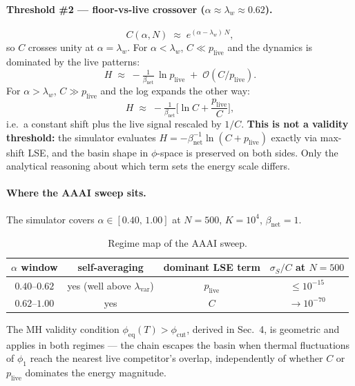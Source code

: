 \documentclass[11pt]{article}
\begin{document}
\paragraph{Threshold \#2 — floor-vs-live crossover ($\alpha \approx \lambda_w \approx 0.62$).}
\begin{equation}
C(\alpha, N) \;\approx\; e^{(\alpha - \lambda_w)\,N},
\end{equation}
so $C$ crosses unity at $\alpha = \lambda_w$. For $\alpha < \lambda_w$, $C\ll p_{\mathrm{live}}$ and the dynamics is dominated by the live patterns:
\begin{equation}
H \;\approx\; -\tfrac{1}{\beta_{\mathrm{net}}}\,\ln p_{\mathrm{live}} \;+\; \mathcal{O}(C/p_{\mathrm{live}}).
\end{equation}
For $\alpha > \lambda_w$, $C\gg p_{\mathrm{live}}$ and the log expands the other way:
\begin{equation}
H \;\approx\; -\tfrac{1}{\beta_{\mathrm{net}}}\!\Big[\ln C + \frac{p_{\mathrm{live}}}{C}\Big],
\end{equation}
i.e.\ a constant shift plus the live signal rescaled by $1/C$. \textbf{This is not a validity threshold:} the simulator evaluates $H = -\beta_{\mathrm{net}}^{-1}\ln(C+p_{\mathrm{live}})$ exactly via max-shift LSE, and the basin shape in $\phi$-space is preserved on both sides. Only the analytical reasoning about which term sets the energy scale differs.

\paragraph{Where the AAAI sweep sits.}
The simulator covers $\alpha \in [0.40,\,1.00]$ at $N=500$, $K=10^4$, $\beta_{\mathrm{net}}=1$.
\begin{table}[h]
\centering
\caption{Regime map of the AAAI sweep.}
\begin{tabular}{cccc}
\toprule
$\alpha$ window & self-averaging & dominant LSE term & $\sigma_S/C$ at $N=500$ \\
\midrule
$0.40$–$0.62$ & yes (well above $\lambda_{\mathrm{var}}$) & $p_{\mathrm{live}}$ & $\le 10^{-15}$ \\
$0.62$–$1.00$ & yes               & $C$                  & $\to 10^{-70}$ \\
\bottomrule
\end{tabular}
\end{table}

The MH validity condition $\phi_{\mathrm{eq}}(T) > \phi_{\mathrm{cut}}$, derived in Sec.~4, is geometric and applies in both regimes — the chain escapes the basin when thermal fluctuations of $\phi_1$ reach the nearest live competitor's overlap, independently of whether $C$ or $p_{\mathrm{live}}$ dominates the energy magnitude.
\end{document}
